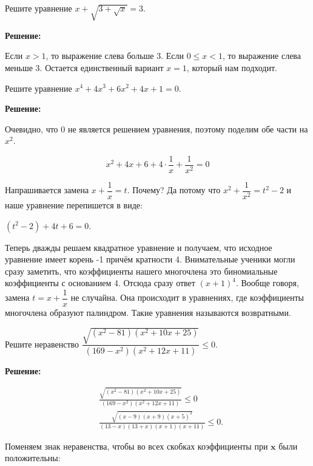 \centerline{\bf \Huge }
\centerline{\bf \Huge }

\begin{flushright}
        \scriptsize{}
\end{flushright}

Решите уравнение $x+\sqrt{3+\sqrt{x}}=3$.

\textbf{Решение:}

Если $x>1$, то выражение слева больше 3. Если $0 \leqslant x<1$, то выражение слева меньше 3. Остается единственный вариант $x=1$, который нам подходит.

Решите уравнение $x^4 + 4x^3 + 6x^2 + 4x + 1 = 0$.

\textbf{Решение:}

Очевидно, что $0$ не является решением уравнения, поэтому поделим обе части на $x^2$.

$$
x^2 + 4x + 6 + 4 \cdot \dfrac{1}{x} + \dfrac{1}{x^2} = 0
$$

Напрашивается замена $x + \dfrac{1}{x} = t$. Почему? Да потому что $x^2 + \dfrac{1}{x^2} = t^2 - 2$ и наше уравнение перепишется в виде:

$(t^2 - 2) + 4t + 6 = 0$.

Теперь дважды решаем квадратное уравнение и получаем, что исходное уравнение имеет корень -1 причём кратности 4. Внимательные ученики могли сразу заметить, что коэффициенты нашего многочлена это биномиальные коэффициенты с основанием 4. Отсюда сразу ответ $(x+1)^4$. Вообще говоря, замена $t = x + \dfrac{1}{x}$ не случайна. Она происходит в уравнениях, где коэффициенты многочлена образуют палиндром. Такие уравнения называются $\textit{возвратными}.$





Решите неравенство $\dfrac{\sqrt{\left(x^2-81\right)\left(x^2+10 x+25\right)}}{\left(169-x^2\right)\left(x^2+12 x+11\right)} \leqslant 0$.

\textbf{Решение:}

$$
\begin{aligned}
& \frac{\sqrt{\left(x^2-81\right)\left(x^2+10 x+25\right)}}{\left(169-x^2\right)\left(x^2+12 x+11\right)} \leqslant 0 \\
& \frac{\sqrt{(x-9)(x+9)(x+5)^2}}{(13-x)(13+x)(x+1)(x+11)} \leqslant 0 .
\end{aligned}
$$


Поменяем знак неравенства, чтобы во всех скобках коэффициенты при $\boldsymbol{x}$ были положительны:

